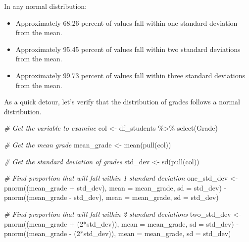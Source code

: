 \documentclass[
]{article}
\newenvironment{Shaded}{\begin{snugshade}}{\end{snugshade}}
\newcommand{\AttributeTok}[1]{\textcolor[rgb]{0.77,0.63,0.00}{#1}}
\newcommand{\CommentTok}[1]{\textcolor[rgb]{0.56,0.35,0.01}{\textit{#1}}}
\newcommand{\DecValTok}[1]{\textcolor[rgb]{0.00,0.00,0.81}{#1}}
\newcommand{\FunctionTok}[1]{\textcolor[rgb]{0.00,0.00,0.00}{#1}}
\newcommand{\NormalTok}[1]{#1}
\newcommand{\OtherTok}[1]{\textcolor[rgb]{0.56,0.35,0.01}{#1}}
\newcommand{\SpecialCharTok}[1]{\textcolor[rgb]{0.00,0.00,0.00}{#1}}
\providecommand{\tightlist}{%
  \setlength{\itemsep}{0pt}\setlength{\parskip}{0pt}}
\begin{document}
In any normal distribution:

\begin{itemize}
\tightlist
\item
  Approximately 68.26 percent of values fall within one standard
  deviation from the mean.
\item
  Approximately 95.45 percent of values fall within two standard
  deviations from the mean.
\item
  Approximately 99.73 percent of values fall within three standard
  deviations from the mean.
\end{itemize}

As a quick detour, let's verify that the distribution of grades follows
a normal distribution.

\begin{Shaded}
\begin{Highlighting}[]
\CommentTok{\# Get the variable to examine}
\NormalTok{col }\OtherTok{\textless{}{-}}\NormalTok{ df\_students }\SpecialCharTok{\%\textgreater{}\%} 
  \FunctionTok{select}\NormalTok{(Grade)}

\CommentTok{\# Get the mean grade}
\NormalTok{mean\_grade }\OtherTok{\textless{}{-}} \FunctionTok{mean}\NormalTok{(}\FunctionTok{pull}\NormalTok{(col))}

\CommentTok{\# Get the standard deviation of grades}
\NormalTok{std\_dev }\OtherTok{\textless{}{-}} \FunctionTok{sd}\NormalTok{(}\FunctionTok{pull}\NormalTok{(col))}

\CommentTok{\# Find proportion that will fall within 1 standard deviation}
\NormalTok{one\_std\_dev }\OtherTok{\textless{}{-}} \FunctionTok{pnorm}\NormalTok{((mean\_grade }\SpecialCharTok{+}\NormalTok{ std\_dev), }\AttributeTok{mean =}\NormalTok{ mean\_grade, }\AttributeTok{sd =}\NormalTok{ std\_dev) }\SpecialCharTok{{-}}
  \FunctionTok{pnorm}\NormalTok{((mean\_grade }\SpecialCharTok{{-}}\NormalTok{ std\_dev), }\AttributeTok{mean =}\NormalTok{ mean\_grade, }\AttributeTok{sd =}\NormalTok{ std\_dev)}

\CommentTok{\# Find proportion that will fall within 2 standard deviations}
\NormalTok{two\_std\_dev }\OtherTok{\textless{}{-}} \FunctionTok{pnorm}\NormalTok{((mean\_grade }\SpecialCharTok{+}\NormalTok{ (}\DecValTok{2}\SpecialCharTok{*}\NormalTok{std\_dev)), }\AttributeTok{mean =}\NormalTok{ mean\_grade, }\AttributeTok{sd =}\NormalTok{ std\_dev) }\SpecialCharTok{{-}} 
  \FunctionTok{pnorm}\NormalTok{((mean\_grade }\SpecialCharTok{{-}}\NormalTok{ (}\DecValTok{2}\SpecialCharTok{*}\NormalTok{std\_dev)), }\AttributeTok{mean =}\NormalTok{ mean\_grade, }\AttributeTok{sd =}\NormalTok{ std\_dev)}


\end{Highlighting}
\end{Shaded}
\end{document}
